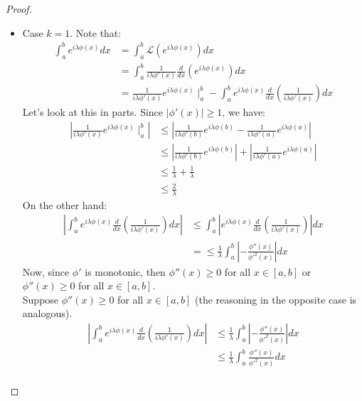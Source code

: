 \begin{proof}{}
  \begin{itemize}
    \item Case $k=1$.
      Note that:
      \begin{align*}
        \int_{a}^{b}e^{i\lambda\phi(x)}dx&=\int_{a}^{b}\mathcal{L}(e^{i\lambda\phi(x)})dx\\
        &=\int_{a}^{b}\frac{1}{i\lambda\phi'(x)}\frac{d}{dx}(e^{i\lambda\phi(x)})dx\\
        &=\frac{1}{i\lambda\phi'(x)}e^{i\lambda\phi(x)}\mid_{a}^{b}-\int_{a}^{b}e^{i\lambda\phi(x)}\frac{d}{dx}\left(\frac{1}{i\lambda\phi'(x)}\right)dx
      \end{align*}
      Let's look at this in parts. Since $|\phi'(x)|\geq 1$, we have:
      \begin{align*}
        \left|\frac{1}{i\lambda\phi'(x)}e^{i\lambda\phi(x)}\mid_{a}^b\right|&\leq \left| \frac{1}{i\lambda\phi'(b)}e^{i\lambda\phi(b)} - \frac{1}{i\lambda\phi'(a)}e^{i\lambda\phi(a)}\right|\\
        &\leq\left| \frac{1}{i\lambda\phi'(b)}e^{i\lambda\phi(b)}\right| + \left|\frac{1}{i\lambda\phi'(a)}e^{i\lambda\phi(a)}\right|\\
        &\leq\frac{1}{\lambda} + \frac{1}{\lambda}\\
        &\leq \frac{2}{\lambda}
      \end{align*}
      On the other hand:
      \begin{align*}
        \left| \int_{a}^{b}e^{i\lambda\phi(x)}\frac{d}{dx}\left(\frac{1}{i\lambda\phi'(x)}\right) dx\right|&\leq \int_{a}^{b}\left|e^{i\lambda\phi(x)}\frac{d}{dx}\left(\frac{1}{i\lambda\phi'(x)}\right)\right|dx\\
        &=\leq \frac{1}{\lambda}\int_{a}^{b}\left|-\frac{\phi''(x)}{\phi'^2(x)}\right|dx
      \end{align*}
      Now, since $\phi'$ is monotonic, then $\phi''(x)\geq 0$ for all $x\in[a,b]$ or $\phi''(x)\geq 0$ for all $x\in[a,b]$.\\
      Suppose $\phi''(x)\geq 0$ for all $x\in[a,b]$ (the reasoning in the opposite case is analogous).\\
      \begin{align*}
        \left| \int_{a}^{b}e^{i\lambda\phi(x)}\frac{d}{dx}\left(\frac{1}{i\lambda\phi'(x)}\right) dx\right|&\leq \frac{1}{\lambda}\int_{a}^{b}\left|-\frac{\phi''(x)}{\phi'^2(x)}\right|dx\\
        &\leq \frac{1}{\lambda}\int_{a}^{b}\frac{\phi''(x)}{\phi'^2(x)}dx\\

\end{align*}
\end{itemize}
\end{proof}
